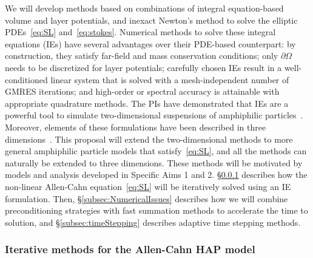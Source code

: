 We will develop methods based on combinations of integral equation-based
volume and layer potentials, and inexact Newton's method to solve the
elliptic PDEs~\eqref{eq:SL} and~\eqref{eq:stokes}. Numerical methods to
solve these integral equations (IEs) have several advantages over their
PDE-based counterpart: by construction, they satisfy far-field and mass
conservation conditions; only $\partial\Omega$ needs to be discretized
for layer potentials; carefully chosen IEs result in a well-conditioned
linear system that is solved with a mesh-independent number of GMRES
iterations; and high-order or spectral accuracy is attainable with
appropriate quadrature methods. The PIs have demonstrated that IEs are a
powerful tool to simulate two-dimensional suspensions of amphiphilic
particles~\cite{Fu2018_SIAM, FuQuRyYo22, fu-ryh-qua-you2022}. Moreover,
elements of these formulations have been described in three
dimensions~\cite{ying_2006, manasthesis, rac-gre2016,
koh-cor-che-vee2021}. This proposal will extend the two-dimensional
methods to more general amphiphilic particle models that
satisfy~\eqref{eq:SL}, and all the methods can naturally be extended to
three dimensions. These methods will be motivated by models and analysis
developed in Specific Aims 1 and 2.  \S\ref{subsec:AC} describes how the
non-linear Allen-Cahn equation~\eqref{eq:SL} will be iteratively solved
using an IE formulation. Then, \S\ref{subsec:NumericalIssues} describes
how we will combine preconditioning strategies with fast summation
methods to accelerate the time to solution, and
\S\ref{subsec:timeStepping} describes adaptive time stepping methods.

\subsubsection{Iterative methods for the Allen-Cahn HAP model}
\label{subsec:AC}

